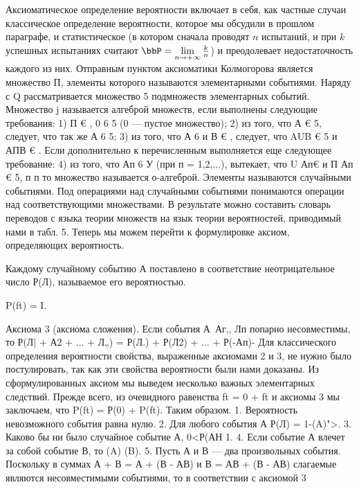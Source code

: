 Аксиоматическое определение вероятности включает в себя, как частные случаи классическое определение вероятности, которое мы обсудили в прошлом параграфе, и статистическое (в котором сначала проводят $n$ испытаний, и при $k$ успешных испытаниях считают $\bbP=\lim_{n \to +\infty}\limits\frac{k}{n}$) и преодолевает недостаточность каждого из них.
Отправным пунктом аксиоматики Колмогорова является множество П, элементы которого называются элементарными событиями. Наряду с Q рассматривается множество 5 подмножеств элементарных событий. Множество j называется алгеброй множеств, если выполнены следующие требования:
1)	П € , 0 6 5 (0 — пустое множество);
2)	из того, что А € 5, следует, что так же А 6 5;
3)	из того, что А 6  и В € , следует, что
AUB € 5 и АПВ € .
Если дополнительно к перечисленным выполняется еще следующее требование:
4)	из того, что Ап 6 У (при п = 1,2,...), вытекает, что
U Ап€ и П Ап € 5,
п	п
то множество  называется о-алгеброй. Элементы  называются
случайными событиями.
Под операциями над случайными событиями понимаются операции над соответствующими множествами. В результате можно составить словарь переводов с языка теории множеств на язык теории вероятностей, приводимый нами в табл. 5.
Теперь мы можем перейти к формулировке аксиом, определяющих вероятность.
\begin{axiom} 
Каждому случайному событию А поставлено в соответствие неотрицательное число Р(Л), называемое его вероятностью.
\end{axiom}
\begin{axiom} 
P(ft) = I.
\end{axiom}
Аксиома 3 (аксиома сложения). Если события А\, Аг,, Лп попарно несовместимы, то
Р(Л| + А2 + ... + Л„) = Р(Л.) + Р(Л2) + ... + Р(-Ап)-
Для классического определения вероятности свойства, выраженные аксиомами 2 и 3, не нужно было постулировать, так как эти свойства вероятности были нами доказаны.
Из сформулированных аксиом мы выведем несколько важных элементарных следствий.
Прежде всего, из очевидного равенства
ft = 0 + ft
и аксиомы 3 мы заключаем, что
P(ft) = Р(0) + P(ft).
Таким образом.
1.	Вероятность невозможного события равна нулю.
2.	Для любого события А
Р(Л) = 1-\bbP(A)">.
3.	Каково бы ни было случайное событие А,
0<Р(АН 1.
4.	Если событие А влечет за собой событие В, то
\bbP(A)  \bbP(B).
5.	Пусть А и В — два произвольных события. Поскольку в суммах А + В = А + (В - АВ) и В = АВ + (В - АВ) слагаемые являются несовместимыми событиями, то в соответствии с аксиомой 3
